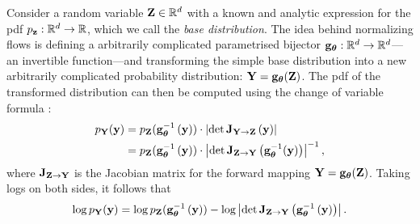 \documentclass{statsmsc}
\begin{document}
Consider a random variable $\mathbf{Z} \in \mathbb{R}^d$ with a known and
analytic expression for the \ac{pdf} $p_{\mathbf{z}}: \mathbb{R}^d \rightarrow {\mathbb{R}}$, which we
call the \textit{base distribution}. The idea behind normalizing flows is
defining a arbitrarily complicated parametrised bijector
$\mathbf{g}_{\bm \theta}:\mathbb{R}^d \rightarrow {\mathbb{R}^d}$---an
invertible function---and transforming the simple base distribution into a new
arbitrarily complicated probability distribution: $\mathbf{Y}=\mathbf{g}_{\bm\theta}(\mathbf{Z})$.
The \ac{pdf} of the transformed distribution can then be computed using the change of variable
formula \citep{normalizing_flows}:
\begin{align}
    p_{\mathbf{Y}}(\mathbf{y})&=p_{\mathbf{Z}}(\mathbf{g}_{\bm\theta}^{-1}\left(\mathbf{y}\right))\cdot \left|\det \mathbf{J}_{\mathbf{Y} \rightarrow {\mathbf{Z}}}\left(\mathbf{y} \right) \right| \nonumber \\
                & = p_{\mathbf{Z}}(\mathbf{g}_{\bm\theta}^{-1}\left(\mathbf{y}\right))\cdot \left|\det \mathbf{J}_{\mathbf{Z} \rightarrow {\mathbf{Y}}}\left( \mathbf{g}^{-1}_{\bm\theta}(\mathbf{y}) \right) \right|^{-1},
\end{align}
where $\mathbf{J}_{\mathbf{Z} \rightarrow {\mathbf{Y}}}$ is the Jacobian matrix for the forward mapping $\mathbf{Y} = \mathbf{g}_{\bm\theta}(\mathbf{Z})$.
Taking logs on both sides, it follows that
\begin{equation}\label{eq:logDetJac}
    \log p_{\mathbf{Y}}(\mathbf{y})= \log p_{\mathbf{Z}}(\mathbf{g}_{\bm\theta}^{-1}\left(\mathbf{y}\right)) - \log \left|\det \mathbf{J}_{\mathbf{Z} \rightarrow {\mathbf{Y}}}\left(\mathbf{g}_{\bm\theta}^{-1}\left(\mathbf{y}\right) \right) \right|.
\end{equation}
\end{document}

